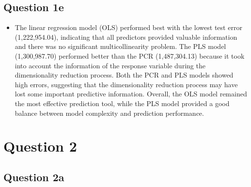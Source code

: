 \documentclass[
  letterpaper,
  DIV=11,
  numbers=noendperiod]{scrartcl}
\providecommand{\tightlist}{%
  \setlength{\itemsep}{0pt}\setlength{\parskip}{0pt}}\usepackage{longtable,booktabs,array}
\begin{document}
\subsection{Question 1e}\label{question-1e}

\begin{itemize}
\tightlist
\item
  The linear regression model (OLS) performed best with the lowest test
  error (1,222,954.04), indicating that all predictors provided valuable
  information and there was no significant multicollinearity problem.
  The PLS model (1,300,987.70) performed better than the PCR
  (1,487,304.13) because it took into account the information of the
  response variable during the dimensionality reduction process. Both
  the PCR and PLS models showed high errors, suggesting that the
  dimensionality reduction process may have lost some important
  predictive information. Overall, the OLS model remained the most
  effective prediction tool, while the PLS model provided a good balance
  between model complexity and prediction performance.
\end{itemize}

\section{Question 2}\label{question-2}

\subsection{Question 2a}\label{question-2a}
\end{document}
